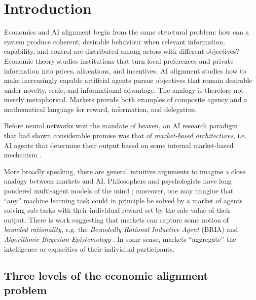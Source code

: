 \chapter{Introduction}
\label{chap:introduction}

\begin{drafttext}
Economics and AI alignment begin from the same structural problem: how can a
system produce coherent, desirable behaviour when relevant information,
capability, and control are distributed among actors with different objectives?
Economic theory studies institutions that turn local preferences and private
information into prices, allocations, and incentives. AI alignment studies how
to make increasingly capable artificial agents pursue objectives that remain
desirable under novelty, scale, and informational advantage. The analogy is
therefore not merely metaphorical. Markets provide both examples of composite
agency and a mathematical language for reward, information, and delegation.
\end{drafttext}

Before neural networks won the mandate of heaven, an AI research paradigm that
had shown considerable promise was that of \emph{market-based architectures},
i.e. AI agents that determine their output based on some internal market-based
mechanism \citep{kweeMarketBasedReinforcementLearning2001,
changDecentralizedReinforcementLearning2020}.

More broadly speaking, there are general intuitive arguments to imagine a close
analogy between markets and AI. Philosophers and psychologists have long
pondered multi-agent models of the mind \citep{minskySocietyMind1988}; moreover,
one may imagine that ``any'' machine learning task could in principle be solved
by a market of agents solving sub-tasks with their individual reward set by the
sale value of their output. There is work suggesting that markets can capture
some notion of \emph{bounded rationality}, e.g. the \emph{Boundedly Rational
Inductive Agent} (BRIA) \citep{oesterheldTheoryBoundedInductive2023} and
\emph{Algorithmic Bayesian Epistemology}
\citep{neymanAlgorithmicBayesianEpistemology2024}. In some sense, markets
``aggregate'' the intelligence or capacities of their individual participants.

\section{Three levels of the economic alignment problem}

